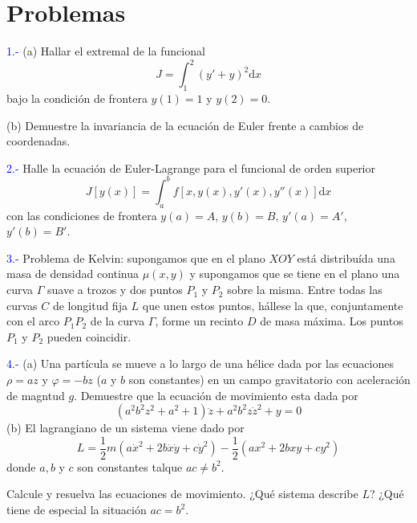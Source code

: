 \documentclass[../main]{subfiles}
\begin{document}
\section{Problemas}

\textcolor{blue}{1.-} (a) Hallar el extremal de la funcional
\begin{equation*}
    J=\int_1^2 (y'+y)^2 \mathrm{d}x
\end{equation*}
\hspace{1.4cm} bajo la condición de frontera $y(1)=1$ y $y(2)=0$.

\hspace{0.7cm} (b) Demuestre la invariancia de la ecuación de Euler frente a cambios de coordenadas.

\textcolor{blue}{2.-} Halle la ecuación de Euler-Lagrange para el funcional de orden superior
\begin{equation*}
    J[y(x)]=\int_a^b f[x,y(x),y'(x),y''(x)]\mathrm{d}x
\end{equation*}
con las condiciones de frontera $y(a)=A$, $y(b)=B$, $y'(a)=A'$, $y'(b)=B'$.

\textcolor{blue}{3.-} Problema de Kelvin: supongamos que en el plano $XOY$ está distribuída una masa de densidad continua $\mu(x,y)$ y supongamos que se tiene en el plano una curva $\Gamma$ suave a trozos y dos puntos $P_1$ y $P_2$ sobre la misma. Entre todas las curvas $C$ de longitud fija $L$ que unen estos puntos, hállese la que, conjuntamente con el arco $P_1P_2$ de la curva $\Gamma$, forme un recinto $D$ de masa máxima. Los puntos $P_1$ y $P_2$ pueden coincidir.

\textcolor{blue}{4.-} (a) Una partícula se mueve a lo largo de una hélice dada por las ecuaciones $\rho=az$ y $\varphi=-bz$ ($a$ y $b$ son constantes) en un campo gravitatorio con aceleración de magntud $g$. Demuestre que la ecuación de movimiento esta dada por
\begin{equation*}
    (a^2b^2z^2+a^2+1)\ddot{z}+a^2b^2z\dot{z}^2+y=0
\end{equation*}
(b) El lagrangiano de un sistema viene dado por
\begin{equation*}
    L=\dfrac{1}{2}m(a\dot{x}^2+2b\dot{x}\dot{y}+c\dot{y}^2)-\dfrac{1}{2}(ax^2+2bxy+cy^2)
\end{equation*}
donde $a, b$ y $c$ son constantes talque $ac\neq b^2$.

Calcule y resuelva las ecuaciones de movimiento. ¿Qué sistema describe $L$? ¿Qué tiene de especial la situación $ac=b^2$.
\end{document}
